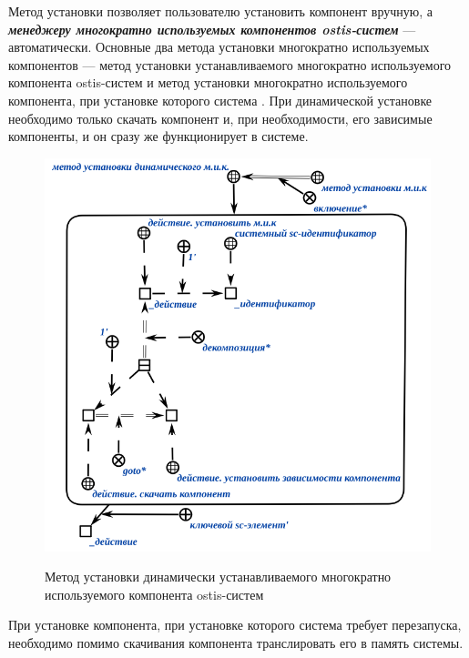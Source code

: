 Метод установки позволяет пользователю установить компонент вручную, а \textbf{\textit{менеджеру многократно используемых компонентов ostis-систем}} --- автоматически. Основные два метода установки многократно используемых компонентов --- метод установки  устанавливаемого многократно используемого компонента ostis-систем и метод установки многократно используемого компонента, при установке которого система . При динамической установке необходимо только скачать компонент и, при необходимости, его зависимые компоненты, и он сразу же функционирует в системе. 

\begin{figure}[H]
	\caption{Метод установки динамически устанавливаемого многократно используемого компонента ostis-систем}
	\includegraphics[scale=0.6]{author/part5/figures/install_dynamic_method.png}
	\label{fig:dynamic_method}
\end{figure}

При установке компонента, при установке которого система требует перезапуска, необходимо помимо скачивания компонента транслировать его в память системы.

